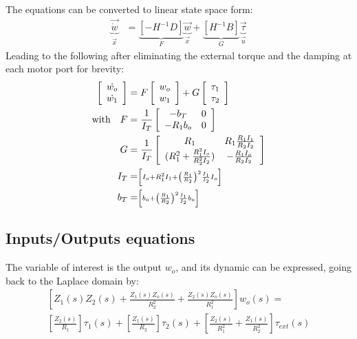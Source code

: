 %
The equations can be converted to linear state space form:
\begin{align}
\underbrace{ \vec{\dot{w}} }_{\dot{\vec{x}}}
 &= 
\underbrace{ \left[ -H^{-1} D \right] }_{F}
\underbrace{ \vec{w} }_{\vec{x}}
+ 
\underbrace{ \left[ H^{-1} B \right] }_{G}
\underbrace{ \vec{\tau} }_{\vec{u}}
\label{eq:ss_full}
\end{align}
%
Leading to the following after eliminating the external torque and the damping at each motor port for brevity:
\begin{align}
\left[
\begin{array}{c}
\dot{w_o}\\
\dot{w_1}
\end{array}
\right] &= 
F
\left[ \begin{array}{c}
w_o \\
w_1
\end{array} \right]+
G
\left[ \begin{array}{c}
\tau_1 \\
\tau_2
\end{array} \right] 
\label{eq:ss}
\\
\text{with} \quad 
F &=
\frac{1}{I_T}
\left[
\begin{array}{c c}
-b_T      &  0 \\
-R_1 b_o  &  0 \\
\end{array}
\right] \\
G &= 
\frac{1}{I_T}
\left[
\begin{array}{c c}
 R_1  &   R_1 \frac{R_1 I_1}{R_2 I_2}  \\
(R_1^2+\frac{R_1^2 I_o}{R_2^2 I_2})  &  - \frac{R_1 I_o}{R_2 I_2} \\
\end{array}
\right] \\
 I_T &=  \scriptstyle \left[   I_o + R_1^2 I_1 + \left( \frac{R_1}{R_2} \right)^2 \frac{I_1}{I_2} I_o \right]\\
 b_T &= \scriptstyle \left[ b_o + \left( \frac{R_1}{R_2} \right)^2 \frac{I_1}{I_2} b_o \right] 
\end{align}
%


\subsection{Inputs/Outputs equations}
\label{sec:out}

The variable of interest is the output $w_o$, and its dynamic can be expressed, going back to the Laplace domain by:
%
\begin{align}
\left[
 Z_1(s) Z_2(s) + \frac{Z_1(s) Z_o(s)}{R_2^2} + \frac{Z_2(s) Z_o(s)}{R_1^2}
\right] w_o(s) = \\
\left[
 \frac{Z_2(s)}{R_1}
\right] \tau_1(s)  + 
\left[
 \frac{Z_1(s)}{R_2}
\right] \tau_2(s)  + 
\left[
 \frac{Z_2(s)}{R_1^2} + \frac{Z_1(s) }{R_2^2}
\right] \tau_{ext}(s)
\label{eq:dsdm_output}
\end{align}


